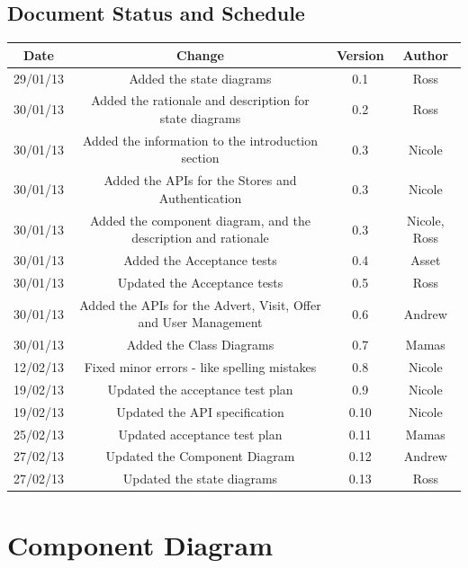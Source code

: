 \documentclass{l3deliverable}
\begin{document}
\subsection{Document Status and Schedule}

\begin{center}{
\begin{tabular}{|c|c|c|c|}
\hline \textbf{Date} &\textbf{ Change} & \textbf{Version} &\textbf{Author}\\ 
\hline 29/01/13 & Added the state diagrams & 0.1 & Ross\\
\hline 30/01/13 & Added the rationale and description for state diagrams & 0.2 & Ross\\
\hline 30/01/13 & Added the information to the introduction section & 0.3 & Nicole\\ 
\hline 30/01/13 & Added the APIs for the Stores and Authentication & 0.3 & Nicole\\
\hline 30/01/13 & Added the component diagram, and the description and rationale & 0.3 & Nicole, Ross\\
\hline 30/01/13 & Added the Acceptance tests & 0.4 & Asset\\
\hline 30/01/13 & Updated the Acceptance tests & 0.5 & Ross\\
\hline 30/01/13 & Added the APIs for the Advert, Visit, Offer and User Management & 0.6 & Andrew\\
\hline 30/01/13 & Added the Class Diagrams & 0.7 & Mamas\\
\hline 12/02/13 & Fixed minor errors - like spelling mistakes & 0.8 & Nicole\\
\hline 19/02/13 & Updated the acceptance test plan & 0.9 & Nicole\\
\hline 19/02/13 & Updated the API specification & 0.10 & Nicole\\
\hline 25/02/13 & Updated acceptance test plan & 0.11 & Mamas\\
\hline 27/02/13 & Updated the Component Diagram & 0.12 & Andrew\\
\hline 27/02/13 & Updated the state diagrams & 0.13 & Ross\\
\hline 
\end{tabular} }
\end{center}


\section{Component Diagram}
\end{document}
